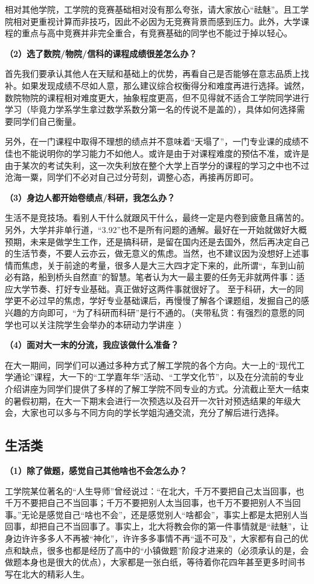 \documentclass[11pt,oneside]{book}
\begin{document}
相对其他学院，工学院的竞赛基础相对没有那么夸张，请大家放心“祛魅”。且工学院相对更重视计算而非技巧，因此不必因为无竞赛背景而感到压力。此外，大学课程的重点与高中竞赛并非完全重合，有竞赛基础的同学也不能过于掉以轻心。

\textbf{（2）选了数院/物院/信科的课程成绩很差怎么办？}

首先我们要承认其他人在天赋和基础上的优势，再看自己是否能够在意志品质上找补。如果发现成绩不尽如人意，那么建议综合权衡得分和难度再进行选择。诚然，数院物院的课程相对难度更大，抽象程度更高，但不见得就不适合工学院同学进行学习（毕竟力学系学生拿过数学系数分第一名的传说不是盖的），具体如何选择需要同学们自己衡量。

另外，在一门课程中取得不理想的绩点并不意味着“天塌了”，一门专业课的成绩不佳也不能说明你的学习能力不如他人。或许是由于对课程难度的预估不准，或许是由于某次的考试失利，这一次失利放在整个大学上百学分的课程的学习之中也不过沧海一粟，同学们不必对自己过分苛刻，调整心态，再接再厉即可。

\textbf{（3）身边人都开始卷绩点/科研，我怎么办？}

生活不是竞技场。看别人干什么就跟风干什么，最终一定是内卷到疲惫且痛苦的。另外，大学并非单行道，“3.92”也不是所有问题的通解。最好在一开始就做好大概预期，未来是做学生工作，还是搞科研，是留在国内还是去国外，然后再决定自己的生活节奏，不要人云亦云，做无意义的焦虑。当然，也不建议因为没想好上述事情而焦虑，关于前途的考量，很多人是大三大四才定下来的，此所谓“，车到山前必有路，船到桥头自然直”的智慧。笔者认为大一最主要的任务无非就两件事：适应大学节奏、打好专业基础。真正做好这两件事就很好了。
至于科研，大一的同学更不必过早的焦虑，学好专业基础课后，再慢慢了解各个课题组，发掘自己的感兴趣的方向即可，“为了科研而科研”是行不通的。（夹带私货：有强烈的意愿的同学也可以关注院学生会举办的本研动力学讲座~）

\textbf{（4）面对大一末的分流，我应该做什么准备？}

在大一期间，同学们可以通过多种方式了解工学院的各个方向。大一上的“现代工学通论”课程，大一下的“工学嘉年华”活动、“工学文化节”，以及在分流前的专业介绍讲座为同学们提供了多样的了解工学院不同专业的方式。分流截止至大一结束的暑假初期，在大一下期末会进行一次预选以及召开一次针对预选结果的年级大会，大家也可以多与不同方向的学长学姐沟通交流，充分了解后进行选择。

\subsection{生活类}
\textbf{（1）除了做题，感觉自己其他啥也不会怎么办？}

工学院某位著名的“人生导师”曾经说过：“在北大，千万不要把自己太当回事，也千万不要把自己不当回事；千万不要把别人太当回事，也千万不要把别人不当回事。”无论是感觉自己“啥也不会”，还是感觉别人“啥都会”，事实上都是太把别人当回事，却把自己不当回事了。事实上，北大将教会你的第一件事情就是“祛魅”，让身边许许多多人不再被“神化”，许许多多事情不再“遥不可及”，大家都有自己的优点和缺点，很多也都是经历了高中的“小镇做题”阶段才进来的（必须承认的是，会做题本身也是很大的优点），大家都是一张白纸，等待着你花四年甚至更多时间书写在北大的精彩人生。
\end{document}

